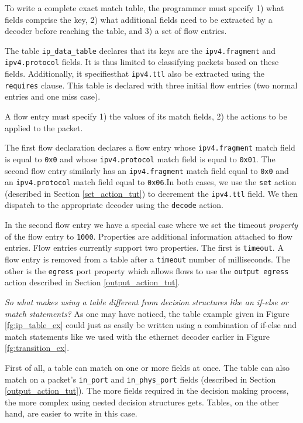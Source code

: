 To write a complete exact match table, the programmer must specify 1) what fields comprise the key, 2) what additional fields need to be extracted by a decoder before reaching the table, and 3) a set of flow entries. 

The table \texttt{ip\_data\_table} declares that its keys are the \texttt{ipv4.fragment} and \texttt{ipv4.protocol} fields. It is thus limited to classifying packets based on these fields. Additionally, it specifiesthat \texttt{ipv4.ttl} also be extracted using the \texttt{\color{blue}requires} clause. This table is declared with three initial flow entries (two normal entries and one miss case).

A flow entry must specify 1) the values of its match fields, 2) the actions to be applied to the packet.

The first flow declaration declares a flow entry whose \texttt{ipv4.fragment} match field is equal to \texttt{0x0} and whose \texttt{ipv4.protocol} match field is equal to \texttt{0x01}. The second flow entry similarly has an \texttt{ipv4.fragment} match field equal to \texttt{0x0} and an \texttt{ipv4.protocol} match field equal to \texttt{0x06}.In both cases, we use the \texttt{set} action (described in Section \ref{set_action_tut}) to decrement the \texttt{ipv4.ttl} field. We then dispatch to the appropriate decoder using the \texttt{decode} action.

In the second flow entry we have a special case where we set the timeout \textit{property} of the flow entry to \texttt{1000}. Properties are additional information attached to flow entries. Flow entries currently support two properties. The first is \texttt{timeout}. A flow entry is removed from a table after a \texttt{timeout} number of milliseconds. The other is the \texttt{egress} port property which allows flows to use the \texttt{\color{blue}output \color{green}egress} action described in Section \ref{output_action_tut}.

\textit{So what makes using a table different from decision structures like an if-else or match statements?} As one may have noticed, the table example given in Figure \ref{fg:ip_table_ex} could just as easily be written using a combination of if-else and match statements like we used with the ethernet decoder earlier in Figure \ref{fg:transition_ex}. 

First of all, a table can match on one or more fields at once. The table can also match on a packet's \texttt{in\_port} and \texttt{in\_phys\_port} fields (described in Section \ref{output_action_tut}). The more fields required in the decision making process, the more complex using nested decision structures gets. Tables, on the other hand, are easier to write in this case.

